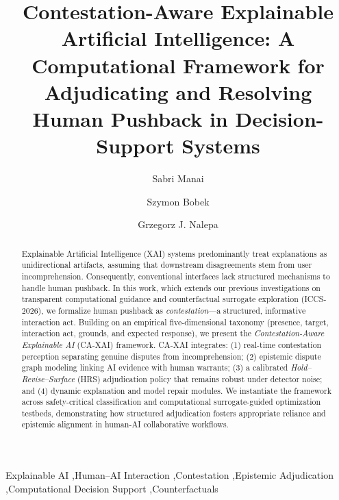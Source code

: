 \documentclass[preprint,12pt,3p,times]{elsarticle}
\begin{document}
\begin{frontmatter}

\title{Contestation-Aware Explainable Artificial Intelligence: A Computational Framework for Adjudicating and Resolving Human Pushback in Decision-Support Systems}

\author[uj]{Sabri Manai}
\author[uj]{Szymon Bobek}
\author[uj]{Grzegorz J. Nalepa}

\address[uj]{Department of Human-Centered Artificial Intelligence, Institute of Applied Computer Science, Jagiellonian University, Krak{\'o}w, Poland}

\begin{abstract}
Explainable Artificial Intelligence (XAI) systems predominantly treat explanations as unidirectional artifacts, assuming that downstream disagreements stem from user incomprehension. Consequently, conventional interfaces lack structured mechanisms to handle human pushback. In this work, which extends our previous investigations on transparent computational guidance and counterfactual surrogate exploration (ICCS-2026), we formalize human pushback as \emph{contestation}---a structured, informative interaction act. Building on an empirical five-dimensional taxonomy (presence, target, interaction act, grounds, and expected response), we present the \emph{Contestation-Aware Explainable AI} (CA-XAI) framework. CA-XAI integrates: (1) real-time contestation perception separating genuine disputes from incomprehension; (2) epistemic dispute graph modeling linking AI evidence with human warrants; (3) a calibrated \emph{Hold--Revise--Surface} (HRS) adjudication policy that remains robust under detector noise; and (4) dynamic explanation and model repair modules. We instantiate the framework across safety-critical classification and computational surrogate-guided optimization testbeds, demonstrating how structured adjudication fosters appropriate reliance and epistemic alignment in human-AI collaborative workflows.
\end{abstract}

\begin{keyword}
Explainable AI \sep Human--AI Interaction \sep Contestation \sep Epistemic Adjudication \sep Computational Decision Support \sep Counterfactuals
\end{keyword}

\end{frontmatter}

\end{document}
